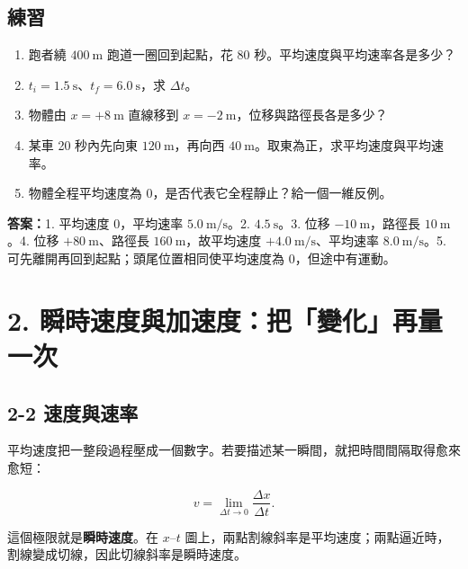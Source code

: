 \documentclass[11pt,a4paper]{article}
\providecommand{\tightlist}{%
  \setlength{\itemsep}{0pt}\setlength{\parskip}{0pt}}
\begin{document}
\begin{HandoutSelfCheck}

\subsection{練習}\label{ux7df4ux7fd2-1}

\begin{enumerate}
\def\labelenumi{\arabic{enumi}.}
\tightlist
\item
  跑者繞 \(400\ \mathrm{m}\) 跑道一圈回到起點，花 80 秒。平均速度與平均速率各是多少？
\item
  \(t_i=1.5\ \mathrm s\)、\(t_f=6.0\ \mathrm s\)，求 \(\Delta t\)。
\item
  物體由 \(x=+8\ \mathrm m\) 直線移到 \(x=-2\ \mathrm m\)，位移與路徑長各是多少？
\item
  某車 20 秒內先向東 \(120\ \mathrm m\)，再向西 \(40\ \mathrm m\)。取東為正，求平均速度與平均速率。
\item
  物體全程平均速度為 0，是否代表它全程靜止？給一個一維反例。
\end{enumerate}

\textbf{答案：}1. 平均速度 \(0\)，平均速率 \(5.0\ \mathrm{m/s}\)。2. \(4.5\ \mathrm s\)。3. 位移 \(-10\ \mathrm m\)，路徑長 \(10\ \mathrm m\)。4. 位移 \(+80\ \mathrm m\)、路徑長 \(160\ \mathrm m\)，故平均速度 \(+4.0\ \mathrm{m/s}\)、平均速率 \(8.0\ \mathrm{m/s}\)。5. 可先離開再回到起點；頭尾位置相同使平均速度為 0，但途中有運動。

\end{HandoutSelfCheck}

\section{2. 瞬時速度與加速度：把「變化」再量一次}\label{ux77acux6642ux901fux5ea6ux8207ux52a0ux901fux5ea6ux628aux8b8aux5316ux518dux91cfux4e00ux6b21}

\subsection{2-2 速度與速率}\label{ux901fux5ea6ux8207ux901fux7387}

平均速度把一整段過程壓成一個數字。若要描述某一瞬間，就把時間間隔取得愈來愈短：

\[
v=\lim_{\Delta t\to0}\frac{\Delta x}{\Delta t}.
\]

這個極限就是\textbf{瞬時速度}。在 \(x\text{–}t\) 圖上，兩點割線斜率是平均速度；兩點逼近時，割線變成切線，因此切線斜率是瞬時速度。
\end{document}
